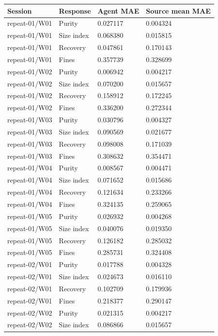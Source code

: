 \documentclass[10pt,a4paper]{article}
\begin{document}
{\def\LTcaptype{table} %
\small\begin{longtable}[]{@{}llll@{}}
\toprule\noalign{}
Session & Response & Agent MAE & Source mean MAE \\
\midrule\noalign{}
\endhead
\bottomrule\noalign{}
\endlastfoot
repeat-01/W01 & Purity & 0.027117 & 0.004324 \\
repeat-01/W01 & Size index & 0.068380 & 0.015815 \\
repeat-01/W01 & Recovery & 0.047861 & 0.170143 \\
repeat-01/W01 & Fines & 0.357739 & 0.328699 \\
repeat-01/W02 & Purity & 0.006942 & 0.004217 \\
repeat-01/W02 & Size index & 0.070200 & 0.015657 \\
repeat-01/W02 & Recovery & 0.158912 & 0.172245 \\
repeat-01/W02 & Fines & 0.336200 & 0.272344 \\
repeat-01/W03 & Purity & 0.030796 & 0.004327 \\
repeat-01/W03 & Size index & 0.090569 & 0.021677 \\
repeat-01/W03 & Recovery & 0.098008 & 0.171039 \\
repeat-01/W03 & Fines & 0.308632 & 0.354471 \\
repeat-01/W04 & Purity & 0.008567 & 0.004471 \\
repeat-01/W04 & Size index & 0.071652 & 0.015686 \\
repeat-01/W04 & Recovery & 0.121634 & 0.233266 \\
repeat-01/W04 & Fines & 0.324135 & 0.259065 \\
repeat-01/W05 & Purity & 0.026932 & 0.004268 \\
repeat-01/W05 & Size index & 0.040076 & 0.019350 \\
repeat-01/W05 & Recovery & 0.126182 & 0.285032 \\
repeat-01/W05 & Fines & 0.285731 & 0.324408 \\
repeat-02/W01 & Purity & 0.017788 & 0.004328 \\
repeat-02/W01 & Size index & 0.024673 & 0.016110 \\
repeat-02/W01 & Recovery & 0.102709 & 0.179936 \\
repeat-02/W01 & Fines & 0.218377 & 0.290147 \\
repeat-02/W02 & Purity & 0.021315 & 0.004217 \\
repeat-02/W02 & Size index & 0.086866 & 0.015657 \\

\end{longtable}}
\end{document}
